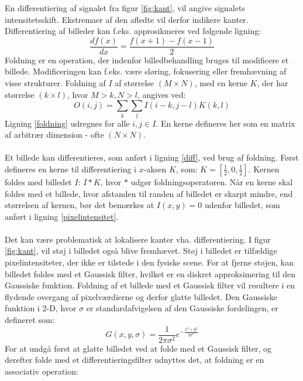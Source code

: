 \noindent
En differentiering af signalet fra figur \ref{fig:kant}, vil angive signalets intensitetsskift. Ekstremaer af den afledte vil derfor indikere kanter. Differentiering af billeder kan f.eks. approsikmeres ved følgende ligning:
\begin{equation}
\dfrac{df(x)}{dx}=\dfrac{f(x+1)-f(x-1)}{2}
\label{diff}
\end{equation}
Foldning er en operation, der indenfor billedbehandling bruges til modificere et billede. Modificeringen kan f.eks. være sløring, fokusering eller fremhævning af visse strukturer. Foldning af $I$ af størrelse $(M \times N)$, med en kerne $K$, der har størrelse $(k \times l)$, hvor $M > k, N > l$, angives ved:
\begin{equation}
O(i,j) = \sum_{k} \sum_{l} I(i-k, j-l) K(k,l)
\label{foldning}
\end{equation}
Ligning \eqref{foldning} udregnes for alle $i,j \in I$. En kerne defineres her som en matrix af arbitrær dimension - ofte $(N\times N)$. 
\\
\\
Et billede kan differentieres, som anført i ligning \eqref{diff}, ved brug af foldning. Først defineres en kerne til differentiering i $x$-aksen $K$, som: $K = [\frac{1}{2}, 0, \frac{1}{2}]$. Kernen foldes med billedet $I$: $I \ast K $, hvor $\ast$ udgør foldningsoperatoren. Når en kerne skal foldes med et billede, hvor afstanden til randen af billedet er skarpt mindre, end størrelsen af kernen, bør det bemærkes at $I(x,y) = 0$ udenfor billedet, som anført i ligning  \eqref{pixelintensitet}.
\\
\\
Det kan være problematisk at lokalisere kanter vha. differentiering. I figur \ref{fig:kant}, vil støj i billedet også blive fremhævet. Støj i billedet er tilfældige pixelintensiteter, der ikke er tilstede i den fysiske scene. For at fjerne støjen, kan billedet foldes med et Gaussisk filter, hvilket er en diskret approksimering til den Gaussiske funktion. Foldning af et billede med et Gaussisk filter vil resultere i en flydende overgang af pixelværdierne og derfor glatte billedet. Den Gaussiske funktion i 2-D, hvor $ \sigma $ er standardafvigelsen af den Gaussiske fordelingen, er defineret som:
\begin{equation}
G(x,y,\sigma) = \frac{1}{2 \pi \sigma ^{2}} e^{- \frac{x^{2} + y^{2}}{2 \sigma ^{2}}}
\label{2dgaussian}
\end{equation} 
For at undgå først at glatte billedet ved at folde med et Gaussisk filter, og derefter folde med et differentieringsfilter udnyttes det, at foldning er en associativ operation:
